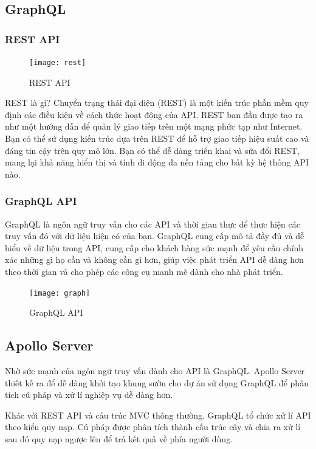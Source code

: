 {{\subsection{GraphQL}

\subsubsection{REST API \cite{web:rest}}

\begin{figure}[h!]
	\caption{REST API}
	\centering
	\texttt{[image: rest]}
	\label{fig:ill:rest}
\end{figure}
REST là gì?
Chuyển trạng thái đại diện (REST) là một kiến trúc phần mềm quy định các điều kiện về cách thức hoạt động của API. REST ban đầu được tạo ra như một hướng dẫn để quản lý giao tiếp trên một mạng phức tạp như Internet. Bạn có thể sử dụng kiến trúc dựa trên REST để hỗ trợ giao tiếp hiệu suất cao và đáng tin cậy trên quy mô lớn. Bạn có thể dễ dàng triển khai và sửa đổi REST, mang lại khả năng hiển thị và tính di động đa nền tảng cho bất kỳ hệ thống API nào.


\subsubsection{GraphQL API}

GraphQL là ngôn ngữ truy vấn cho các API và thời gian thực để thực hiện các truy vấn đó với dữ liệu hiện có của bạn. GraphQL cung cấp mô tả đầy đủ và dễ hiểu về dữ liệu trong API, cung cấp cho khách hàng sức mạnh để yêu cầu chính xác những gì họ cần và không cần gì hơn, giúp việc phát triển API dễ dàng hơn theo thời gian và cho phép các công cụ mạnh mẽ dành cho nhà phát triển.

\begin{figure}[h!]
	\caption{GraphQL API}
	\centering
	\texttt{[image: graph]}
	\label{fig:ill:graph}
\end{figure}

\pagebreak

\subsection{Apollo Server}
Nhờ sức mạnh của ngôn ngữ truy vấn dành cho API là GraphQL. Apollo Server thiết kế ra để dễ dàng khởi tạo khung sườn cho dự án sử dụng GraphQL để phân tích cú pháp và xử lí nghiệp vụ dễ dàng hơn.

Khác với REST API và cấu trúc MVC thông thường. GraphQL tổ chức xử lí API theo kiểu quy nạp. Cú pháp được phân tích thành cấu trúc cây và chia ra xử lí sau đó quy nạp ngược lên để trả kết quả về phía người dùng.

}}
